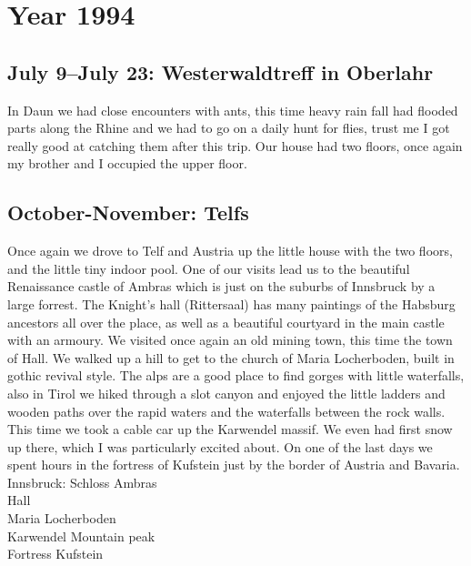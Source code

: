 \chapter{Year 1994}
\label{1994}

\section{July 9--July 23: Westerwaldtreff in Oberlahr}
\label{1994:Westerwald}

In Daun we had close encounters with ants, this time heavy rain fall had flooded parts along the Rhine and we had to go on a daily hunt for flies, trust me I got really good at catching them after this trip. Our house had two floors, once again my brother and I occupied the upper floor.\\




\section{October-November: Telfs}
\label{1994:Telfs}

Once again we drove to Telf and Austria up the little house with the two floors, and the little tiny indoor pool. One of our visits lead us to the beautiful Renaissance castle of Ambras which is just on the suburbs of Innsbruck by a large forrest. The Knight's hall (Rittersaal) has many paintings of the Habsburg ancestors all over the place, as well as a beautiful courtyard in the main castle with an armoury. We visited once again an old mining town, this time the town of Hall. We walked up a hill to get to the church of Maria Locherboden, built in gothic revival style. The alps are a good place to find gorges with little waterfalls, also in Tirol we hiked through a slot canyon and enjoyed the little ladders and wooden paths over the rapid waters and the waterfalls between the rock walls. This time we took a cable car up the Karwendel massif. We even had first snow up there, which I was particularly excited about. On one of the last days we spent hours in the fortress of Kufstein just by the border of Austria and Bavaria.\\

Innsbruck: Schloss Ambras\\
Hall\\
Maria Locherboden\\
Karwendel Mountain peak\\
Fortress Kufstein\\

